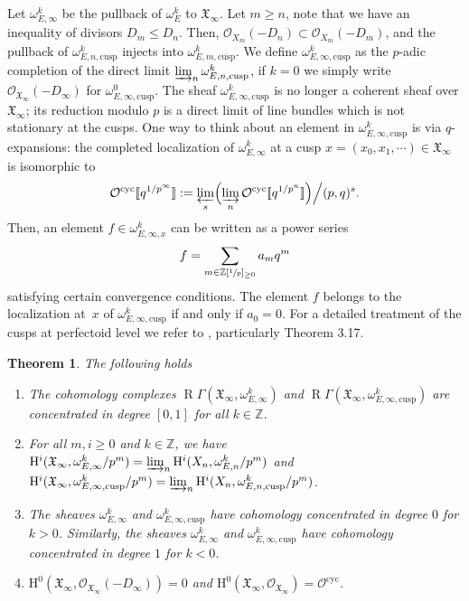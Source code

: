 \documentclass[JEP,XML,SOM,Unicode,published]{cedram}
\newcommand{\lcr}{[\![}
\newcommand{\rcr}{]\!]}
\newcommand{\cusp}{\mathrm{cusp}}
\newcommand{\cyc}{\mathrm{cyc}}
\numberwithin{equation}{section}
\newtheorem{theo}[prop]{Theorem}
\theoremstyle{definition}
\newcommand{\bb}[1]{\mathbb{#1}}
\newcommand{\n}[1]{\mathcal{#1}}
\newcommand{\f}[1]{\mathfrak{#1}}
\newcommand{\s}[1]{\mathscr{#1}}
\DeclareMathOperator{\R}{R}
\begin{document}
Let $\omega_{E,\infty}^{k}$ be the pullback of $\omega_E^k$ to $\f{X}_{\infty}$. Let $m\geq n$, note that we have an inequality of divisors $D_m\leq D_n$. Then, $\s{O}_{X_m}(-D_n)\subset \s{O}_{X_m}(-D_m)$, and the pullback of $\omega^k_{E,n,\cusp}$ injects into $\omega^k_{E,m,\cusp}$. We define $\omega^{k}_{E,\infty,\cusp}$ as the $p$-adic completion of the direct limit $\varinjlim_n \omega^k_{E,n,\cusp}$, if $k=0$ we simply write $\s{O}_{\f{X}_{\infty}}(-D_{\infty})$ for $\omega^0_{E,\infty, \cusp}$. The sheaf $\omega^k_{E,\infty,\cusp}$ is no longer a coherent sheaf over $\f{X}_\infty$; its reduction modulo $p$ is a direct limit of line bundles which is not stationary at the cusps. One way to think about an element in $\omega^k_{E,\infty,\cusp}$ is via $q$-expansions: the completed localization of $\omega^k_{E,\infty}$ at a cusp $x=(x_0,x_1,\cdots)\in \f{X}_{\infty}$ is isomorphic to
\[
\n{O}^{\cyc}\lcr q^{1/p^\infty}\rcr:= \varprojlim_{s} \Bigl(\varinjlim_n \n{O}^{\cyc}\lcr q^{1/p^n}\rcr\Bigr)\Big/(p,q)^s.
\]
Then, an element $f\in \omega^k_{E,\infty,x}$ can be written as a power series
\[
f= \sum_{m\in \bb{Z}[\sfrac{1}{p}]_{\geq 0}} a_m q^{m}
\]
satisfying certain convergence conditions. The element $f$ belongs to the localization at~$x$ of $\omega^k_{E,\infty, \cusp}$ if and only if $a_0=0$. For a detailed treatment of the cusps at perfectoid level we refer to \cite{heuer2020cusps}, particularly Theorem 3.17.

\begin{theo}
\label{corVanishingCohPerfectoid}
The following holds

\begin{enumerate}
\item\label{corVanishingCohPerfectoid1} The cohomology complexes $\R\Gamma(\f{X}_{\infty}, \omega^k_{E,\infty})$ and $\R\Gamma(\f{X}_{\infty}, \omega^k_{E,\infty,\cusp})$ are concentrated in degree $[0,1]$ for all $k\in \bb{Z}$.

\item\label{corVanishingCohPerfectoid2} For all $m,i\geq 0$ and $k\in \bb{Z}$, we have $\mathrm{H}^i(\f{X}_{\infty}, \omega^k_{E,\infty}/p^m)=\varinjlim_n \mathrm{H}^i(X_n, \omega^k_{E,n}/p^m)$ and $\mathrm{H}^i(\f{X}_{\infty}, \omega^k_{E,\infty,\cusp}/p^m)=\varinjlim_n \mathrm{H}^i(X_n, \omega^k_{E,n,\cusp}/p^m)$.

\item\label{corVanishingCohPerfectoid3} The sheaves $\omega_{E,\infty}^{k}$ and $\omega_{E,\infty,\cusp}^k$ have cohomology concentrated in degree $0$ for $k>0$. Similarly, the sheaves $\omega_{E,\infty}^{k}$ and $\omega_{E,\infty,\cusp}^{k}$ have cohomology concentrated in degree $1$ for $k<0$.

\item\label{corVanishingCohPerfectoid4} $\mathrm{H}^0(\f{X}_{\infty}, \s{O}_{\f{X}_{\infty}}(-D_{\infty}))=0$ and $\mathrm{H}^0(\f{X}_{\infty}, \s{O}_{\f{X}_{\infty}})= \n{O}^{\cyc} $.
\end{enumerate}
\end{theo}
\end{document}
